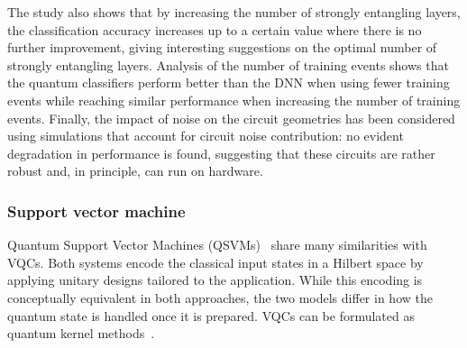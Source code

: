 The study also shows that by increasing the number of strongly entangling layers, the classification accuracy increases up to a certain value where there is no further improvement, giving interesting suggestions on the optimal number of strongly entangling layers. Analysis of the number of training events shows that the quantum classifiers perform better than the DNN when using fewer training events while reaching similar performance when increasing the number of training events.
Finally, the impact of noise on the circuit geometries has been considered using simulations that account for circuit noise contribution: no evident degradation in performance is found, suggesting that these circuits are rather robust and, in principle, can run on hardware.

\subsubsection{Support vector machine}
\label{sec:svm}

Quantum Support Vector Machines (QSVMs)~\cite{Rebentrost2014} share many similarities with VQCs.
Both systems encode the classical input states in a Hilbert space by applying unitary designs tailored to the application.
While this encoding is conceptually equivalent in both approaches, the two models differ in how the quantum state is handled once it is prepared.
VQCs can be formulated as quantum kernel methods~\cite{SchuldKernel}.

